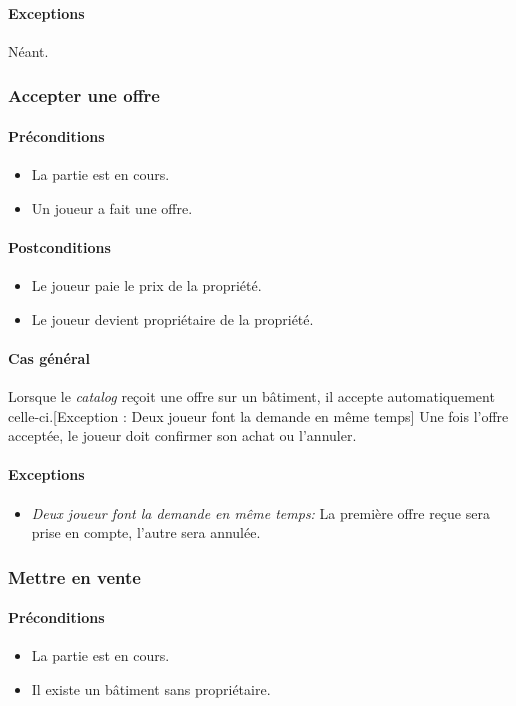 \documentclass[a4paper,11pt]{report}
\begin{document}
\paragraph{Exceptions} Néant.

\subsubsection{Accepter une offre}
\paragraph{Préconditions}
\begin{itemize}
 \item La partie est en cours.
 \item Un joueur a fait une offre.
\end{itemize}
\paragraph{Postconditions}
\begin{itemize}
 \item Le joueur paie le prix de la propriété.
 \item Le joueur devient propriétaire de la propriété.
\end{itemize}
\paragraph{Cas général}
Lorsque le \textit{catalog} reçoit une offre sur un bâtiment, il accepte automatiquement celle-ci.[Exception : Deux joueur font la demande en même temps] Une fois l'offre acceptée, le joueur doit confirmer son achat ou l'annuler.
\paragraph{Exceptions}
\begin{itemize}
 \item \textit{Deux joueur font la demande en même temps:} La première offre reçue sera prise en compte, l'autre sera annulée.
\end{itemize}

\subsubsection{Mettre en vente}
\paragraph{Préconditions}
\begin{itemize}
 \item La partie est en cours.
 \item Il existe un bâtiment sans propriétaire.
\end{itemize}
\end{document}
